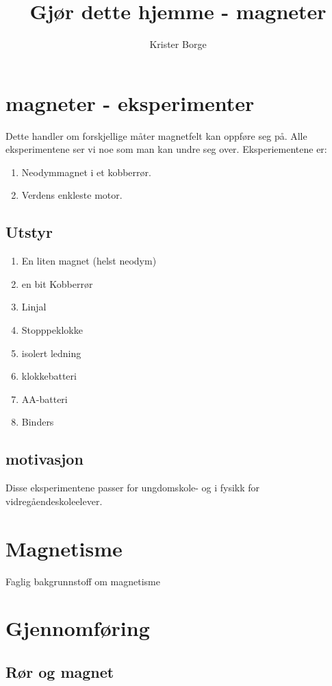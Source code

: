 \documentclass[11pt]{article} %
\title{Gjør dette hjemme - magneter}
\author{Krister Borge}
\begin{document}
\maketitle

\section{magneter - eksperimenter}

Dette handler om forskjellige måter magnetfelt kan oppføre seg på. Alle eksperimentene ser vi noe som man kan undre seg over.
Eksperiementene er:
\begin{enumerate}[•]
\item
Neodymmagnet i et kobberrør.
\item
Verdens enkleste motor.
\end{enumerate}

\subsection{Utstyr}
\begin{enumerate}[•]
\item
En liten magnet (helst neodym)
\item
en bit Kobberrør
\item
Linjal
\item
Stopppeklokke
\item
isolert ledning
\item
klokkebatteri
\item
AA-batteri
\item
Binders
\end{enumerate}

\subsection{motivasjon}
Disse eksperimentene passer for ungdomskole- og i fysikk for vidregåendeskoleelever.

\section{Magnetisme}
Faglig bakgrunnstoff om magnetisme

\section{Gjennomføring}

\subsection{Rør og magnet}
\end{document}
